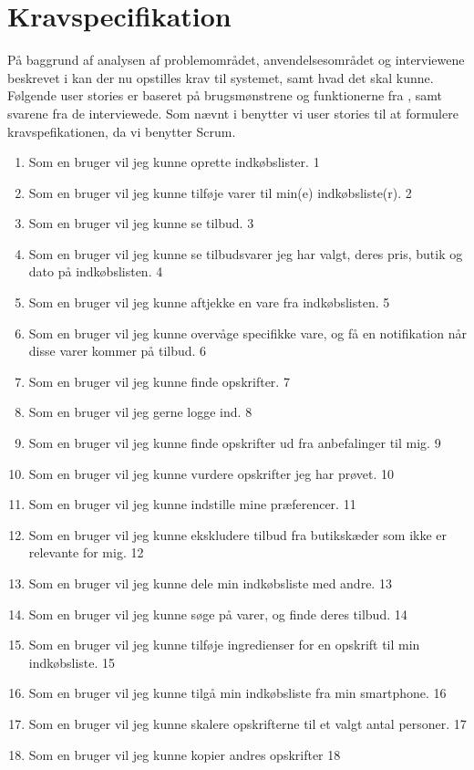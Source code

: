 \section{Kravspecifikation}\label{sec:krav}

På baggrund af analysen af problemområdet, anvendelsesområdet og interviewene beskrevet i   kan der nu opstilles krav til systemet, samt hvad det skal kunne.
Følgende user stories er baseret på brugsmønstrene og funktionerne fra , samt svarene fra de interviewede.
Som nævnt i  benytter vi user stories til at formulere kravspefikationen, da vi benytter Scrum.
\begin{enumerate}
	\item Som en bruger vil jeg kunne oprette indkøbslister. 1
	\item Som en bruger vil jeg kunne tilføje varer til min(e) indkøbsliste(r). 2
	\item Som en bruger vil jeg kunne se tilbud. 3
	\item Som en bruger vil jeg kunne se tilbudsvarer jeg har valgt, deres pris, butik og dato på indkøbslisten. 4
	\item Som en bruger vil jeg kunne aftjekke en vare fra indkøbslisten. 5
	\item Som en bruger vil jeg kunne overvåge specifikke vare, og få en notifikation når disse varer kommer på tilbud. 6
	\item Som en bruger vil jeg kunne finde opskrifter. 7
	\item Som en bruger vil jeg gerne logge ind. 8
	\item Som en bruger vil jeg kunne finde opskrifter ud fra anbefalinger til mig. 9
	\item Som en bruger vil jeg kunne vurdere opskrifter jeg har prøvet. 10
	\item Som en bruger vil jeg kunne indstille mine præferencer. 11
	\item Som en bruger vil jeg kunne ekskludere tilbud fra butikskæder som ikke er relevante for mig. 12
	\item Som en bruger vil jeg kunne dele min indkøbsliste med andre. 13
	\item Som en bruger vil jeg kunne søge på varer, og finde deres tilbud. 14
	\item Som en bruger vil jeg kunne tilføje ingredienser for en opskrift til min indkøbsliste. 15
	\item Som en bruger vil jeg kunne tilgå min indkøbsliste fra min smartphone. 16
	\item Som en bruger vil jeg kunne skalere opskrifterne til et valgt antal personer. 17
	\item Som en bruger vil jeg kunne kopier andres opskrifter 18
\end{enumerate}

